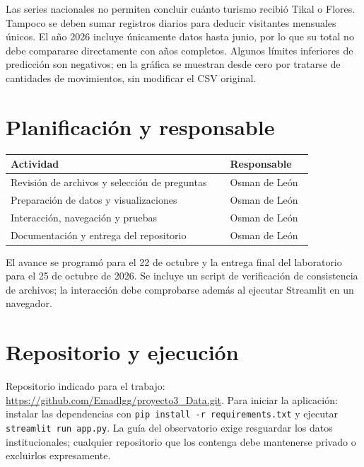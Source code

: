 \documentclass[11pt,letterpaper]{article}
\begin{document}
Las series nacionales no permiten concluir cuánto turismo recibió Tikal o Flores. Tampoco se deben sumar registros diarios para deducir visitantes mensuales únicos. El año 2026 incluye únicamente datos hasta junio, por lo que su total no debe compararse directamente con años completos. Algunos límites inferiores de predicción son negativos; en la gráfica se muestran desde cero por tratarse de cantidades de movimientos, sin modificar el CSV original.

\section{Planificación y responsable}
\begin{center}\small
\begin{tabular}{@{}p{0.62\linewidth}p{0.23\linewidth}@{}}\toprule
Actividad & Responsable\\\midrule
Revisión de archivos y selección de preguntas & Osman de León\\
Preparación de datos y visualizaciones & Osman de León\\
Interacción, navegación y pruebas & Osman de León\\
Documentación y entrega del repositorio & Osman de León\\\bottomrule
\end{tabular}
\end{center}

El avance se programó para el 22 de octubre y la entrega final del laboratorio para el 25 de octubre de 2026. Se incluye un script de verificación de consistencia de archivos; la interacción debe comprobarse además al ejecutar Streamlit en un navegador.

\section{Repositorio y ejecución}
Repositorio indicado para el trabajo: \url{https://github.com/Emadlgg/proyecto3_Data.git}. Para iniciar la aplicación: instalar las dependencias con \texttt{pip install -r requirements.txt} y ejecutar \texttt{streamlit run app.py}. La guía del observatorio exige resguardar los datos institucionales; cualquier repositorio que los contenga debe mantenerse privado o excluirlos expresamente.
\end{document}
